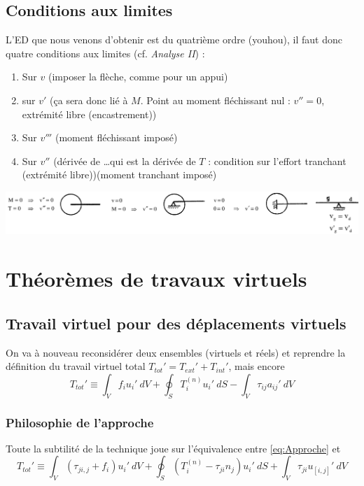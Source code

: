 	\subsection{Conditions aux limites}
	L'ED que nous venons d'obtenir est du quatrième ordre (youhou), il faut 
	donc quatre conditions aux limites (cf. \textit{Analyse II}) :
	\begin{enumerate}
	\item Sur $v$ (imposer la flèche, comme pour un appui)
	\item sur $v'$ (ça sera donc lié à $M$. Point au moment fléchissant nul : 
	$v''=0$, extrémité libre (encastrement))
	\item Sur $v'''$ (moment fléchissant imposé)
	\item Sur $v''$ (dérivée de \dots qui est la dérivée de $T$ : condition 
	sur l'effort tranchant (extrémité libre))(moment tranchant imposé)	
	\end{enumerate}
	\begin{center}
	\includegraphics[scale=0.24]{ch9/image1}
	\end{center}


\section{Théorèmes de travaux virtuels}
	\subsection{Travail virtuel pour des déplacements virtuels}
	On va à nouveau reconsidérer deux ensembles (virtuels et réels) et 
	reprendre la définition du travail virtuel total $T_{tot}' = 
	T_{ext}'+T_{int}'$, mais encore 
	\begin{equation}
	T_{tot}' \equiv \int_V f_iu_i'\ dV + \oint_S T_i^{(n)}u_i'\ dS - 
	\int_V \tau_{ij}a_{ij}'\ dV
	\label{eq:Approche}
	\end{equation}
		
		\subsubsection{Philosophie de l'approche}
		Toute la subtilité de la technique joue sur l'équivalence entre 
		\autoref{eq:Approche} et 
		\begin{equation}
		T_{tot}' \equiv \int_V(\tau_{ji,j}+f_i)u_i'\ dV +\oint_S (T_i^{(n)}
		-\tau_{ji}n_j)u_i'\ dS + \int_V \tau_{ji}u_{[i,j]}'\ dV
		\end{equation}
		
